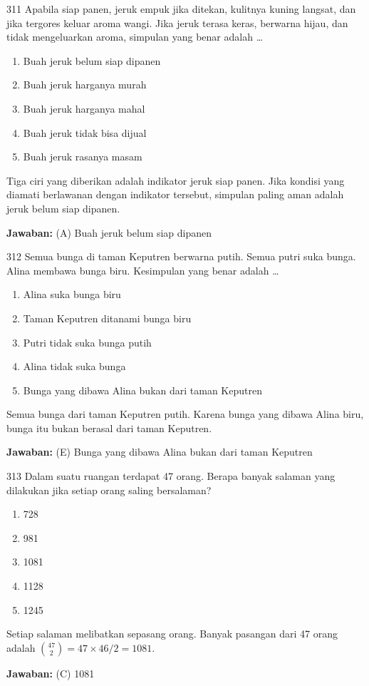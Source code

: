 \documentclass[11pt]{article}
\newenvironment{pil}{\begin{enumerate}[label=(\Alph*),leftmargin=*,itemsep=1pt,topsep=3pt]}{\end{enumerate}}
\newcommand{\jw}[1]{\par\smallskip\begin{jawbox}\textbf{Jawaban:} #1\end{jawbox}}
\begin{document}
\begin{soalbox}{3}{11}
Apabila siap panen, jeruk empuk jika ditekan, kulitnya kuning langsat, dan jika tergores keluar aroma wangi. Jika jeruk terasa keras, berwarna hijau, dan tidak mengeluarkan aroma, simpulan yang benar adalah \ldots
\begin{pil}\item Buah jeruk belum siap dipanen \item Buah jeruk harganya murah \item Buah jeruk harganya mahal \item Buah jeruk tidak bisa dijual \item Buah jeruk rasanya masam\end{pil}
\end{soalbox}
\begin{pembox}
Tiga ciri yang diberikan adalah indikator jeruk siap panen. Jika kondisi yang diamati berlawanan dengan indikator tersebut, simpulan paling aman adalah jeruk belum siap dipanen.
\jw{(A) Buah jeruk belum siap dipanen}
\end{pembox}

\begin{soalbox}{3}{12}
Semua bunga di taman Keputren berwarna putih. Semua putri suka bunga. Alina membawa bunga biru. Kesimpulan yang benar adalah \ldots
\begin{pil}\item Alina suka bunga biru \item Taman Keputren ditanami bunga biru \item Putri tidak suka bunga putih \item Alina tidak suka bunga \item Bunga yang dibawa Alina bukan dari taman Keputren\end{pil}
\end{soalbox}
\begin{pembox}
Semua bunga dari taman Keputren putih. Karena bunga yang dibawa Alina biru, bunga itu bukan berasal dari taman Keputren.
\jw{(E) Bunga yang dibawa Alina bukan dari taman Keputren}
\end{pembox}

\begin{soalbox}{3}{13}
Dalam suatu ruangan terdapat 47 orang. Berapa banyak salaman yang dilakukan jika setiap orang saling bersalaman?
\begin{pil}\item 728 \item 981 \item 1081 \item 1128 \item 1245\end{pil}
\end{soalbox}
\begin{pembox}
Setiap salaman melibatkan sepasang orang. Banyak pasangan dari 47 orang adalah $\binom{47}{2}=47\times46/2=1081$.
\jw{(C) 1081}
\end{pembox}
\end{document}
